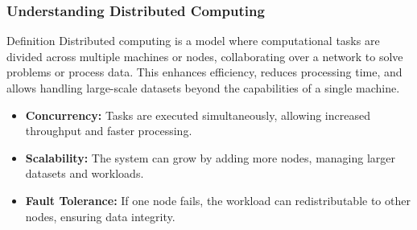 \documentclass[aspectratio=169]{beamer}
\begin{document}
\begin{frame}[fragile]
    \frametitle{Understanding Distributed Computing}
    \begin{block}{Definition}
        Distributed computing is a model where computational tasks are divided across multiple machines or nodes, collaborating over a network to solve problems or process data. This enhances efficiency, reduces processing time, and allows handling large-scale datasets beyond the capabilities of a single machine.
    \end{block}
    
    \begin{itemize}
        \item \textbf{Concurrency:} Tasks are executed simultaneously, allowing increased throughput and faster processing.
        \item \textbf{Scalability:} The system can grow by adding more nodes, managing larger datasets and workloads.
        \item \textbf{Fault Tolerance:} If one node fails, the workload can redistributable to other nodes, ensuring data integrity.
    \end{itemize}
\end{frame}
\end{document}
